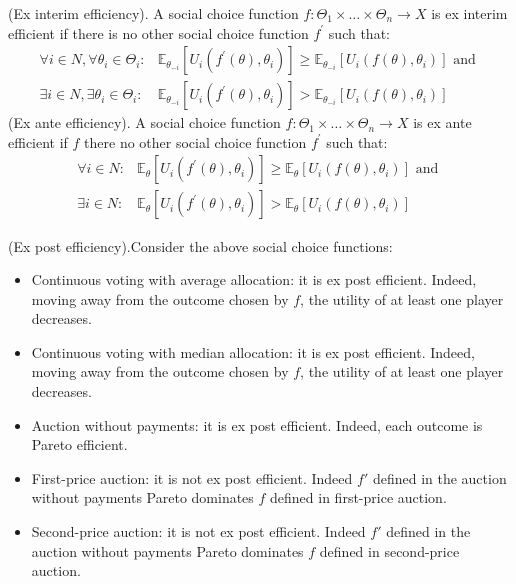 (Ex interim efficiency). A social choice function $f: \Theta_{1} \times \ldots \times \Theta_{n} \rightarrow X$ is ex interim efficient if there is no other social choice function $f^{\prime}$ such that:
$$
\begin{array}{ll}
\forall i \in N, \forall \theta_{i} \in \Theta_{i}: & \mathbb{E}_{\theta_{-i}}\left[U_{i}\left(f^{\prime}(\theta), \theta_{i}\right)\right] \geqslant \mathbb{E}_{\theta_{-i}}\left[U_{i}\left(f(\theta), \theta_{i}\right)\right] \text { and } \\
\exists i \in N, \exists \theta_{i} \in \Theta_{i}: & \mathbb{E}_{\theta_{-i}}\left[U_{i}\left(f^{\prime}(\theta), \theta_{i}\right)\right]>\mathbb{E}_{\theta_{-i}}\left[U_{i}\left(f(\theta), \theta_{i}\right)\right]
\end{array}
$$
(Ex ante efficiency). A social choice function $f: \Theta_{1} \times \ldots \times \Theta_{n} \rightarrow X$ is ex ante efficient if $f$ there no other social choice function $f^{\prime}$ such that:
$$
\begin{array}{ll}
\forall i \in N: & \mathbb{E}_{\theta}\left[U_{i}\left(f^{\prime}(\theta), \theta_{i}\right)\right] \geqslant \mathbb{E}_{\theta}\left[U_{i}\left(f(\theta), \theta_{i}\right)\right] \text { and } \\
\exists i \in N: & \mathbb{E}_{\theta}\left[U_{i}\left(f^{\prime}(\theta), \theta_{i}\right)\right]>\mathbb{E}_{\theta}\left[U_{i}\left(f(\theta), \theta_{i}\right)\right]
\end{array}
$$

(Ex post efficiency).Consider the above social choice functions:
\begin{itemize}
\item Continuous voting with average allocation: it is ex post efficient. Indeed, moving away from the outcome chosen by $f$, the utility of at least one player decreases.
\item Continuous voting with median allocation: it is ex post efficient. Indeed, moving away from the outcome chosen by $f$, the utility of at least one player decreases.
\item Auction without payments: it is ex post efficient. Indeed, each outcome is Pareto efficient.
\item First-price auction: it is not ex post efficient. Indeed $f'$ defined in the auction without payments Pareto dominates $f$ defined in first-price auction.
\item Second-price auction: it is not ex post efficient. Indeed $f'$ defined in the auction without payments Pareto dominates $f$ defined in second-price auction.
\end{itemize}

